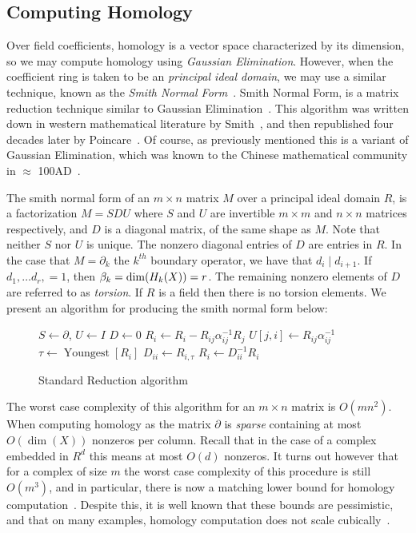 \subsection{Computing Homology}
Over field coefficients, homology is a vector space characterized by its dimension, so we may compute homology using \emph{Gaussian Elimination}. However, when the coefficient ring is taken to be an \emph{principal ideal domain}, we may use a similar technique, known as the \emph{Smith Normal Form}~\cite{uhlig}. Smith Normal Form, is a matrix reduction technique similar to Gaussian Elimination~\cite{uhlig}. This algorithm was written down in western mathematical literature by Smith~\cite{smith}, and then republished four decades later by Poincare~\cite{poincare-smith}. Of course, as previously mentioned this is a variant of Gaussian Elimination, which was known to the Chinese mathematical community in $\approx$ 100AD~\cite{chinese-ge}.

The smith normal form of an $m \times n$ matrix $M$ over a principal ideal domain $R$, is a factorization $M = SDU$ where $S$ and $U$ are invertible $m \times m$ and $n \times n$ matrices respectively, and $D$ is a diagonal matrix, of the same shape as $M$. Note that neither $S$ nor $U$ is unique. The nonzero diagonal entries of $D$ are entries in $R$. In the case that $M = \partial_k$ the $k^{th}$  boundary operator, we have that $d_i \mid d_{i+1}$. If $d_1, \ldots d_r, = 1$, then $\beta_k = \dim(H_k(X)) = r$. The remaining nonzero elements of $D$ are referred to as \emph{torsion}. If $R$ is a field then there is no torsion elements. We present an algorithm for producing the smith normal form below:

\begin{figure}
\begin{codebox}
\li $S \gets \partial$, $U \gets I$
\li $D \gets 0$
\li {}
\li \Do {}
\li \Do
\li   $R_i \gets R_i - R_{ij}\alpha^{-1}_{ij}R_j$
\li   $U[j,i] \gets R_{ij}\alpha^{-1}_{ij}$
    \End
\li   $\tau \gets \operatorname{Youngest}[R_i]$
\li   $D_{ii} \gets R_{i,\tau}$
\li   $R_{i} \gets D_{ii}^{-1}R_{i}$
\End
\end{codebox}
\caption{Standard Reduction algorithm}
\label{alg:elz}
\end{figure}

The worst case complexity of this algorithm for an $m \times n$ matrix is $O(mn^2)$. When computing homology as the matrix $\partial$ is \emph{sparse} containing at most $O(\operatorname{dim}{(X)})$ nonzeros per column. Recall that in the case of a complex embedded in $R^d$ this means at most $O(d)$ nonzeros. It turns out however that for a complex of size $m$ the worst case complexity of this procedure is still $O(m^3)$, and in particular, there is now a matching lower bound for homology computation~\cite{parsa}. Despite this, it is well known that these bounds are pessimistic, and that on many examples, homology computation does not scale cubically~\cite{elz-tps-02}. 

